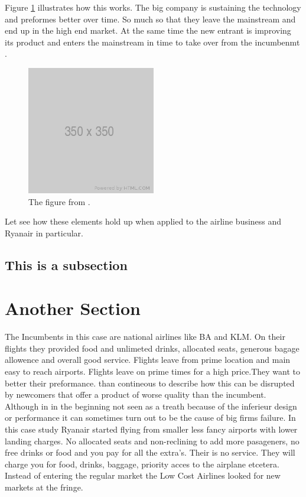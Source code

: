 \documentclass[a4paper, 11pt]{article}
\begin{document}
Figure \ref{fig:graph1} illustrates how this works. The big company is sustaining the technology and preformes better over time. So much so that they leave the mainstream and end up in the high end market. At the same time the new entrant is improving its product and enters the mainstream in time to take over from the incumbenmt \cite{Christensen97}.

\begin{figure}[h!]
    \centering
    \includegraphics[width=0.5\textwidth]{350.png}
    \caption{The figure from \cite{Christensen97}.}
    \label{fig:graph1}
\end{figure}


Let see how these elements hold up when applied to the airline business and Ryanair in particular.


\subsection{This is a subsection}
\label{sec:this-is-a-section}

\section{Another Section}


The Incumbents in this case are national airlines like BA and KLM. On their flights they provided food and unlimeted drinks, allocated seats, generous bagage allowence and overall good service. Flights leave from prime location and main easy to reach airports. Flights leave on prime times for a high price.They want to better their preformance. \cite{Christensen97} than contineous to describe how this can be disrupted by newcomers that offer a product of worse quality than the incumbent. Although in in the beginning not seen as a treath because of the inferieur design or performance it can sometimes turn out to be the cause of big firms failure. In this case study Ryanair started flying from smaller less fancy airports with lower landing charges. No allocated seats and non-reclining to add more pasageners, no free drinks or food and you pay for all the extra's. Their is no service. They will charge you for food, drinks, baggage, priority acces to the airplane etcetera.
Instead of entering the regular market the Low Cost Airlines looked for new markets at the fringe.
\end{document}
